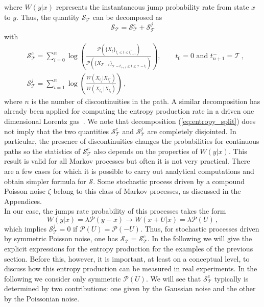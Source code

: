 \documentclass[12pt]{iopart}
\newcommand{\lx} {\left}
\newcommand{\rx} {\right}
\newcommand{\cP} {\mathcal{P}}
\newcommand{\cS} {\mathcal{S}}
\newcommand{\cT} {\mathcal{T}}
\begin{document}
where $W(y|x)$ represents the instantaneous jump probability rate from state $x$ to $y$. Thus, the quantity $\cS_\cT$ can be decomposed as
\begin{equation}
\cS_\cT = \cS_\cT^{c}+\cS_\cT^{j}
\label{eq:entropy_split}
\end{equation}
with
\begin{align}
&\cS_\cT^{c}=\sum_{i=0}^n \log\lx(\frac{\cP(\{X_t\}_{t_{i}\le t \le t_{i+1}^{-}})}{\cP(\{ X_{\cT -t}\}_{\cT-t_{i+1}^- \le t \le \cT-t_i})}\rx), \quad \quad t_0=0 \text{ and } t_{n+1}^{-}=\cT\,,\\
&\cS_\cT^{j}=\sum_{i=1}^n\log\lx(\frac{W\lx(X_{t_i}|X_{t_i^-}\rx)}{W\lx(X_{t_i^-}| X_{t_i}\rx)}\rx)\,,
\end{align}
where $n$ is the number of discontinuities in the path. A similar decomposition has already been applied for computing the entropy production rate in a driven one dimensional Lorentz gas~\cite{gradenigo2012nonequilibrium}. We note that decomposition (\ref{eq:entropy_split}) does not imply that the two quantities $\cS_\cT^{c}$ and $\cS_\cT^{j}$ are completely disjointed. In particular, the presence of discontinuities changes the probabilities for continuous paths so the statistics of $\cS_\cT^{c}$ also depends on the properties of $W(y|x)$. This result is valid for all Markov processes but often it is not very practical. There are a few cases for which it is possible to carry out analytical computations and obtain  simpler formula for $\cS$. Some stochastic process driven by a compound Poisson noise $\zeta$ belong to this class of Markov processes, as discussed in the Appendices.\\
In our case, the jumps rate probability of this processes takes the form
\begin{equation}
    W\lx(y|x\rx)=\lambda \cP(y-x)\rightarrow W\lx(x+U|x\rx)=\lambda \cP(U)\,,
\end{equation}
which implies $\cS_\cT^{j}=0$ if $\cP(U)=\cP(-U)$. Thus, for stochastic processes driven by symmetric Poisson noise, one has $\cS_{\cT}=\cS^{c}_\cT$. In the following we will give the explicit expressions for the entropy production for the examples of the previous section. Before this, however, it is important, at least on a conceptual level, to discuss how this entropy production can be measured in real experiments. 
In the following we consider only symmetric $\cP(U)$. We will see that $\cS_\cT^c$ typically is determined by two contributions: one given by the Gaussian noise and the other by the Poissonian noise.
\end{document}

